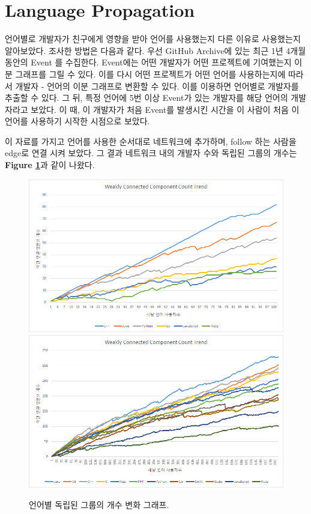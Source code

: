 \documentclass[10pt, a4paper, titlepage]{article}
\begin{document}
\section{Language Propagation}

언어별로 개발자가 친구에게 영향을 받아 언어를 사용했는지 다른 이유로 사용했는지 알아보았다. 조사한 방법은 다음과 같다.
우선 GitHub Archive에 있는 최근 1년 4개월 동안의 Event 를 수집한다. Event에는 어떤 개발자가 어떤 프로젝트에 기여했는지 이분 그래프를 그릴 수 있다. 이를 다시 어떤 프로젝트가 어떤 언어를 사용하는지에 따라서 개발자 - 언어의 이분 그래프로 변환할 수 있다. 이를 이용하면 언어별로 개발자를 추출할 수 있다. 그 뒤, 특정 언어에 5번 이상 Event가 있는 개발자를 해당 언어의 개발자라고 보았다. 이 때, 이 개발자가 처음 Event를 발생시킨 시간을 이 사람이 처음 이 언어를 사용하기 시작한 시점으로 보았다.

이 자료를 가지고 언어를 사용한 순서대로 네트워크에 추가하며, follow 하는 사람을 edge로 연결 시켜 보았다. 그 결과 네트워크 내의 개발자 수와 독립된 그룹의 개수는 
{\bf Figure \ref{fig:cctrend}}과 같이 나왔다.

\begin{figure}
\includegraphics[width=\textwidth]{image11}
\includegraphics[width=\textwidth]{image_cc}
\caption{언어별 독립된 그룹의 개수 변화 그래프.}
\label{fig:cctrend}
\end{figure}
\end{document}
